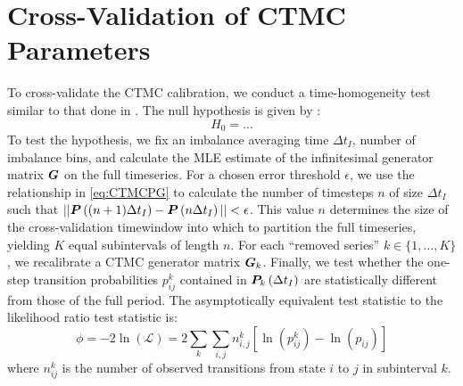 \section{Cross-Validation of CTMC Parameters}
To cross-validate the CTMC calibration, we conduct a time-homogeneity test similar to that done in \cite{Tan02}. The null hypothesis is given by \cite{Weiss10}:
\begin{equation}
H_0 = ...
\end{equation}
To test the hypothesis, we fix an imbalance averaging time $\Delta t_I$, number of imbalance bins, and calculate the MLE estimate of the infinitesimal generator matrix $\boldsymbol{G}$ on the full timeseries. For a chosen error threshold $\epsilon$, we use the relationship in \eqref{eq:CTMCPG} to calculate the number of timesteps $n$ of size $\Delta t_I$ such that $||\boldsymbol{P}\left((n+1)\Delta t_I \right) - \boldsymbol{P} \left( n\Delta t_I \right) || < \epsilon$. This value $n$ determines the size of the cross-validation timewindow into which to partition the full timeseries, yielding $K$ equal subintervals of length $n$. For each ``removed series'' $k \in \{ 1,\dots,K \}$, we recalibrate a CTMC generator matrix $\boldsymbol{G}_{k}$. Finally, we test whether the one-step transition probabilities $p_{ij}^k$ contained in $\boldsymbol{P}_k \left(\Delta t_I \right)$ are statistically different from those of the full period. The asymptotically equivalent test statistic to the likelihood ratio test statistic is:
\begin{equation}
\phi = -2 \ln (\mathcal{L})  = 2 \sum_k \sum_{i,j} n_{i,j}^k \left[ \ln(p_{ij}^k)  - \ln(p_{ij})   \right]
\end{equation}
where $n_{ij}^k$ is the number of observed transitions from state $i$ to $j$ in subinterval $k$. 

